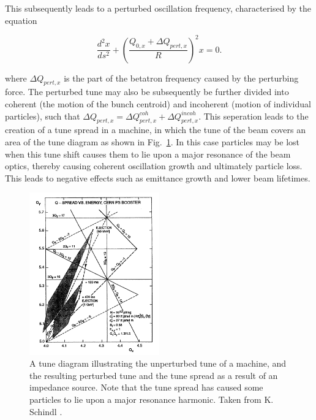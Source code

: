 This subsequently leads to a perturbed oscillation frequency, characterised by the equation

\begin{equation}
\frac{d^{2}x}{ds^{2}} + \left(\frac{Q_{0,x}+ \Delta Q_{pert,x}}{R}\right)^{2} x = 0.
\end{equation}

where $\Delta Q_{pert,x}$ is the part of the betatron frequency caused by the perturbing force. The perturbed tune may also be subsequently be further divided into coherent (the motion of the bunch centroid) and incoherent (motion of individual particles), such that $\Delta Q_{pert,x} = \Delta Q^{coh}_{pert, x} + \Delta Q^{incoh}_{pert, x}$. This seperation leads to the creation of a tune spread in a machine, in which the tune of the beam covers an area of the tune diagram as shown in Fig.~\ref{fig:tune_diag_tune_shift}. In this case particles may be lost when this tune shift causes them to lie upon a major resonance of the beam optics, thereby causing coherent oscillation growth and ultimately particle loss. This leads to negative effects such as emittance growth and lower beam lifetimes.

\begin{figure}
\begin{center}
\includegraphics[width=0.5\textwidth]{Wakefields_and_Impedances/figures/tune-spread-sc.png}
\end{center}
\caption{A tune diagram illustrating the unperturbed tune of a machine, and the resulting perturbed tune and the tune spread as a result of an impedance source. Note that the tune spread has caused some particles to lie upon a major resonance harmonic. Taken from K. Schindl \cite{Schindl:SpaceCharge}.}
\label{fig:tune_diag_tune_shift}
\end{figure}

